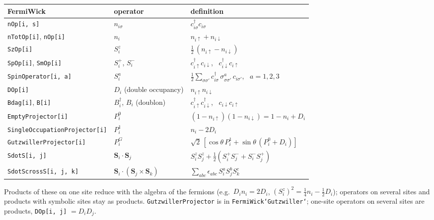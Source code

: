\begin{center}\small
\renewcommand{\arraystretch}{1.25}
\begin{tabular}{lll}\toprule
FermiWick & operator & definition \\ \midrule
\texttt{nOp[i, s]} & $n_{i\sigma}$ & $c^\dagger_{i\sigma}c_{i\sigma}$ \\
\texttt{nTotOp[i]}, \texttt{nOp[i]} & $n_i$ & $n_{i\uparrow}+n_{i\downarrow}$ \\
\texttt{SzOp[i]} & $S^z_i$ & $\tfrac12\,(n_{i\uparrow}-n_{i\downarrow})$ \\
\texttt{SpOp[i]}, \texttt{SmOp[i]} & $S^+_i$, $S^-_i$ & $c^\dagger_{i\uparrow}c_{i\downarrow}$, \ $c^\dagger_{i\downarrow}c_{i\uparrow}$ \\
\texttt{SpinOperator[i, a]} & $S^a_i$ & $\tfrac12\sum_{\sigma\sigma'}c^\dagger_{i\sigma}\,\sigma^a_{\sigma\sigma'}\,c_{i\sigma'}$, \ $a=1,2,3$ \\
\texttt{DOp[i]} & $D_i$ (double occupancy) & $n_{i\uparrow}n_{i\downarrow}$ \\
\texttt{Bdag[i]}, \texttt{B[i]} & $B^\dagger_i$, $B_i$ (doublon) & $c^\dagger_{i\uparrow}c^\dagger_{i\downarrow}$, \ $c_{i\downarrow}c_{i\uparrow}$ \\
\texttt{EmptyProjector[i]} & $P^0_i$ & $(1-n_{i\uparrow})(1-n_{i\downarrow})=1-n_i+D_i$ \\
\texttt{SingleOccupationProjector[i]} & $P^1_i$ & $n_i-2D_i$ \\
\texttt{GutzwillerProjector[i]} & $P^G_i$ & $\sqrt2\,[\cos\theta\,P^1_i+\sin\theta\,(P^0_i+D_i)]$ \\
\texttt{SdotS[i, j]} & $\mathbf S_i\cdot\mathbf S_j$ & $S^z_iS^z_j+\tfrac12(S^+_iS^-_j+S^-_iS^+_j)$ \\
\texttt{SdotScrossS[i, j, k]} & $\mathbf S_i\cdot(\mathbf S_j\times\mathbf S_k)$ & $\sum_{abc}\epsilon_{abc}\,S^a_iS^b_jS^c_k$ \\ \bottomrule
\end{tabular}
\end{center}
Products of these on one site reduce with the algebra of the fermions (e.g.\ $D_in_i=2D_i$, $(S^z_i)^2=\tfrac14n_i-\tfrac12D_i$);
operators on several sites and products with symbolic sites stay as products. \texttt{GutzwillerProjector} is in
\texttt{FermiWick`Gutzwiller`}; one-site operators on several sites are products, \texttt{DOp[i, j]} $=D_iD_j$.
